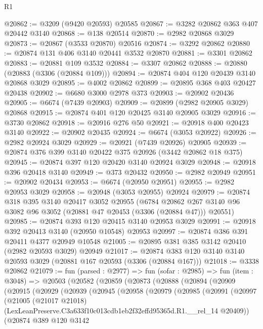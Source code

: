 \begin{lexlean}{R1}
\begin{coremodule}
@20862 := @3209 (@9420 @20593) @20585
@20867 := @3282 @20862 @363 @407 @20442 @3140
@20868 := @138 @20514
@20870 := @2982 @20868 @3029
@20873 := @20867 (@3533 @20870) @20516
@20874 := @3292 @20862
@20880 := @20874 @131 @406 @3140 @20441 @3532 @20870
@20881 := @3301 @20862
@20883 := @20881 @109 @3532
@20884 := @3307 @20862
@20888 := @20880 (@20883 (@3306 (@20884 @109)))
@20894 := @20874 @404 @120 @20439 @3140 @20868 @3029
@20895 := @4002 @20862
@20899 := @20895 @368 @403 @20427 @20438
@20902 := @6680 @3000 @2978 @373
@20903 := @20902 @20436
@20905 := @6674 (@7439 @20903)
@20909 := @20899 (@2982 @20905 @3029) @20868
@20915 := @20874 @401 @120 @20425 @3140 @20905 @3029
@20916 := @3730 @20862
@20918 := @20916 @276 @50
@20921 := @20918 @400 @20423 @3140
@20922 := @20902 @20435
@20924 := @6674 (@3053 @20922)
@20926 := @2982 @20924 @3029
@20929 := @20921 (@7439 @20926) @20905
@20939 := @20874 @376 @399 @3140 @20422 @375 @20926 (@3442 @20862 @18 @375)
@20945 := @20874 @397 @120 @20420 @3140 @20924 @3029
@20948 := @20918 @396 @20418 @3140
@20949 := @373 @20432
@20950 := @2982 @20949
@20951 := @20902 @20434
@20953 := @6674 (@20950 @20951)
@20955 := @2982 @20953 @3029
@20958 := @20948 (@3053 @20955) @20924
@20979 := @20874
    @318
    @395
    @3140
    @20417
    @3052
    @20955
    (@6784 @20862 @267 @3140 @96 @3082 @96 @3052 (@20881 @47 @20453 (@3306 (@20884 @47))) @20551)
@20985 := @20874 @393 @120 @20415 @3140 @20953 @3029
@20991 := @20918 @392 @20413 @3140 (@20950 @10548) @20953
@20997 := @20874 @386 @391 @20411 @4377 @20949 @10548
@21005 := @20895 @381 @385 @3142 @20410 (@2982 @20593 @3029) @20949
@21017 := @20874 @383 @120 @3140 @3140 @20593 @3029 (@20881 @167 @20593 (@3306 (@20884 @167)))
@21018 := @3338 @20862
@21079 := fun (parsed : @2977) =>
  fun (sofar : @2985) =>
  fun (item : @3048) =>
  @20503
    (@20582
      (@20859
        (@20873
          (@20888
            (@20894
              (@20909
                (@20915
                  (@20929
                    (@20939
                      (@20945
                        (@20958
                          (@20979
                            (@20985
                              (@20991
                                (@20997
                                  (@21005
                                    (@21017 @21018)
                                    (LexLeanPreserve.C3a633f10c013cdb1eb2f32effd95365d.R1.__rel_14
                                      @20409))
                                  (@20874
                                    @389
                                    @120
                                    @3142

\end{coremodule}
\end{lexlean}
